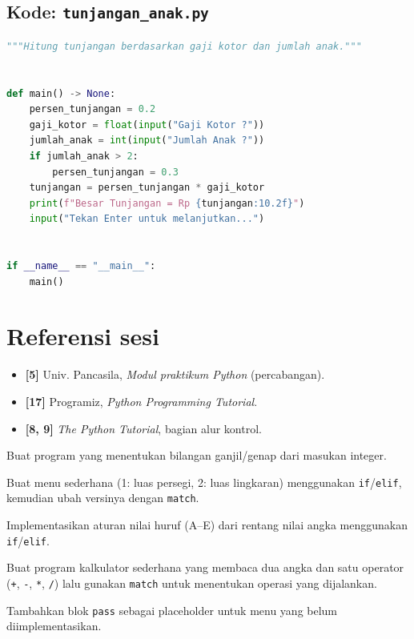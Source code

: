 ﻿\documentclass[../main.tex]{subfiles}
\begin{document}
\subsection{Kode: \texttt{tunjangan\_anak.py}}
\introstudikasuskode
\begin{lstlisting}[language=Python,caption={\texttt{tunjangan\_anak.py}}]
"""Hitung tunjangan berdasarkan gaji kotor dan jumlah anak."""


def main() -> None:
    persen_tunjangan = 0.2
    gaji_kotor = float(input("Gaji Kotor ?"))
    jumlah_anak = int(input("Jumlah Anak ?"))
    if jumlah_anak > 2:
        persen_tunjangan = 0.3
    tunjangan = persen_tunjangan * gaji_kotor
    print(f"Besar Tunjangan = Rp {tunjangan:10.2f}")
    input("Tekan Enter untuk melanjutkan...")


if __name__ == "__main__":
    main()
\end{lstlisting}

\section{Referensi sesi}

\begin{itemize}[leftmargin=*]
  \item \textbf{[5]} Univ. Pancasila, \textit{Modul praktikum Python} (percabangan).
  \item \textbf{[17]} Programiz, \textit{Python Programming Tutorial}.
  \item \textbf{[8, 9]} \textit{The Python Tutorial}, bagian alur kontrol.
\end{itemize}

\begin{aktivitas}
  \item Buat program yang menentukan bilangan ganjil/genap dari masukan integer.
  \item Buat menu sederhana (1: luas persegi, 2: luas lingkaran) menggunakan \texttt{if}/\texttt{elif}, kemudian ubah versinya dengan \texttt{match}.
  \item Implementasikan aturan nilai huruf (A--E) dari rentang nilai angka menggunakan \texttt{if}/\texttt{elif}.
  \item Buat program kalkulator sederhana yang membaca dua angka dan satu operator (\texttt{+}, \texttt{-}, \texttt{*}, \texttt{/}) lalu gunakan \texttt{match} untuk menentukan operasi yang dijalankan.
  \item Tambahkan blok \texttt{pass} sebagai placeholder untuk menu yang belum diimplementasikan.
\end{aktivitas}
\end{document}
